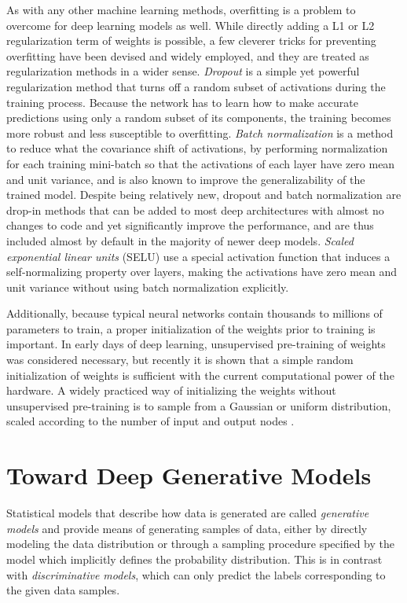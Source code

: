 As with any other machine learning methods, overfitting is a problem to overcome for deep learning models as well.
While directly adding a L1 or L2 regularization term of weights is possible, a few cleverer tricks for preventing overfitting have been devised and widely employed, and they are treated as regularization methods in a wider sense.
\emph{Dropout} \cite{srivastava2014dropout} is a simple yet powerful regularization method that turns off a random subset of activations during the training process.
Because the network has to learn how to make accurate predictions using only a random subset of its components, the training becomes more robust and less susceptible to overfitting.
\emph{Batch normalization} \cite{ioffe2015batchnorm} is a method to reduce what the covariance shift of activations, by performing normalization for each training mini-batch so that the activations of each layer have zero mean and unit variance, and is also known to improve the generalizability of the trained model.
Despite being relatively new, dropout and batch normalization are drop-in methods that can be added to most deep architectures with almost no changes to code and yet significantly improve the performance, and are thus included almost by default in the majority of newer deep models.
\emph{Scaled exponential linear units} (SELU) \cite{klambauer2017selu} use a special activation function that induces a self-normalizing property over layers, making the activations have zero mean and unit variance without using batch normalization explicitly.


Additionally, because typical neural networks contain thousands to millions of parameters to train, a proper initialization of the weights prior to training is important.
In early days of deep learning, unsupervised pre-training of weights \cite{bengio2007greedy,erhan2010pretraining} was considered necessary, but recently it is shown that a simple random initialization of weights is sufficient with the current computational power of the hardware.
A widely practiced way of initializing the weights without unsupervised pre-training is to sample from a Gaussian or uniform distribution, scaled according to the number of input and output nodes \cite{glorot2010initialization,he2015prelu}.


\section{Toward Deep Generative Models}

Statistical models that describe how data is generated are called \emph{generative models} and provide means of generating samples of data, either by directly modeling the data distribution or through a sampling procedure specified by the model which implicitly defines the probability distribution.
This is in contrast with \emph{discriminative models}, which can only predict the labels corresponding to the given data samples.

